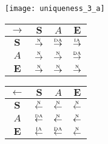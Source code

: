 \begin{figure}[htbp]
  \centering

  \begin{subfigure}{1\textwidth}
    \centering
    \begin{minipage}[b]{1\textwidth}
      \centering
      \texttt{[image: uniqueness\_3\_a]}
    \end{minipage}
    \begin{minipage}[b]{0.3\textwidth}
      \vspace{1em}
      \centering
      \begin{tabular}{|c|c|c|c|} \hline
        $\rightarrow$ & $\bm{S}$ & $A$ & $\bm{E}$\\ \hline
        $\bm{S}$ & $\overset{\text{\tiny{N}}}{\rightarrow}$ & $\overset{\text{\tiny{DA}}}{\rightarrow}$ & $\overset{\text{\tiny{IA}}}{\rightarrow}$\\ \hline
        $A$ & $\overset{\text{\tiny{N}}}{\rightarrow}$ & $\overset{\text{\tiny{N}}}{\rightarrow}$ & $\overset{\text{\tiny{DA}}}{\rightarrow}$\\ \hline
        $\bm{E}$ & $\overset{\text{\tiny{N}}}{\rightarrow}$ & $\overset{\text{\tiny{N}}}{\rightarrow}$ & $\overset{\text{\tiny{N}}}{\rightarrow}$\\ \hline
      \end{tabular}
    \end{minipage}
    \begin{minipage}[b]{0.3\textwidth}
      \vspace{1em}
      \centering
      \begin{tabular}{|c|c|c|c|} \hline
        $\leftarrow$ & $\bm{S}$ & $A$ & $\bm{E}$\\ \hline
        $\bm{S}$ & $\overset{\text{\tiny{N}}}{\leftarrow}$ & $\overset{\text{\tiny{N}}}{\leftarrow}$ & $\overset{\text{\tiny{N}}}{\leftarrow}$\\ \hline
        $A$ & $\overset{\text{\tiny{DA}}}{\leftarrow}$ & $\overset{\text{\tiny{N}}}{\leftarrow}$ & $\overset{\text{\tiny{N}}}{\leftarrow}$\\ \hline
        $\bm{E}$ & $\overset{\text{\tiny{IA}}}{\leftarrow}$ & $\overset{\text{\tiny{DA}}}{\leftarrow}$ & $\overset{\text{\tiny{N}}}{\leftarrow}$\\ \hline
      \end{tabular}
    \end{minipage}
    \begin{minipage}[b]{0.3\textwidth}
      \vspace{1em}

\end{minipage}
\end{subfigure}
\end{figure}
